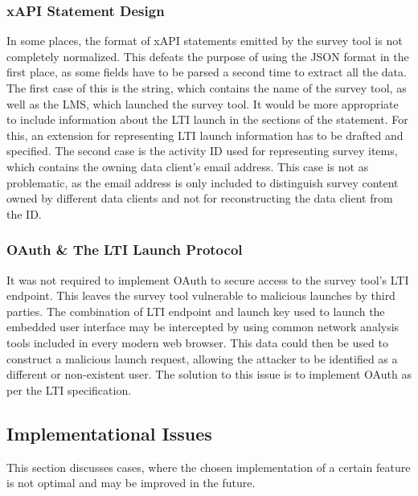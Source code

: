 	   	\subsubsection{xAPI Statement Design}
        \label{analysis:known-issues:xapi-not-normalized}
	   		In some places, the format of xAPI statements emitted by
	   		the survey tool is not completely normalized. This defeats
	   		the purpose of using the JSON format in the first place,
	   		as some fields have to be parsed a second time to extract all the
	   		data. The first case of this is the  string,
	   		which contains the name of the survey tool, as well as the
	   		LMS, which launched the survey tool. It would be more appropriate
	   		to include information about the LTI launch in the
	   		 sections of the statement. For this,
	   		an extension for representing LTI launch information
	   		has to be drafted and specified.
	   		The second case is the activity ID used for representing
	   		survey items, which contains the owning data client's
	   		email address. This case is not as problematic, as the
	   		email address is only included to distinguish survey
	   		content owned by different data clients and not for
	   		reconstructing the data client from the ID.

		\subsubsection{OAuth \& The LTI Launch Protocol}
			It was not required to implement OAuth to secure
			access to the survey tool's LTI endpoint.
			This leaves the survey tool vulnerable to malicious
			launches by third parties. The combination of
			LTI endpoint and launch key used to launch the embedded
			user interface may be intercepted by using common
			network analysis tools included in every modern
			web browser. This data could then be used to construct
			a malicious launch request, allowing the attacker
			to be identified as a different or non-existent user.
			The solution to this issue is to implement OAuth
			as per the LTI specification.


    \subsection{Implementational Issues}
    	This section discusses cases, where the chosen implementation
    	of a certain feature is not optimal and may be improved in the
    	future.

